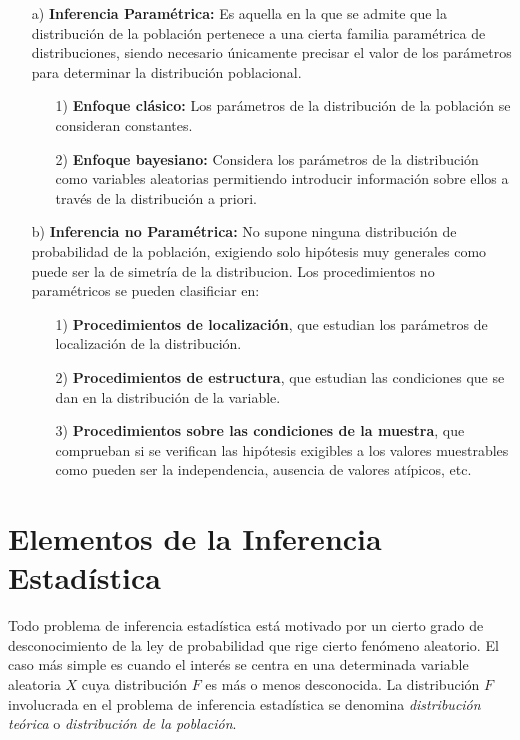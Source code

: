 \begin{enumerate}
    \item[a)] \textbf{Inferencia Paramétrica:} Es aquella en la que se admite que la distribución de la población pertenece a una cierta familia paramétrica de distribuciones, siendo necesario únicamente precisar el valor de los parámetros para determinar la distribución poblacional.
          \begin{enumerate}
              \item[1)] \textbf{Enfoque clásico:} Los parámetros de la distribución de la población se consideran constantes.
              \item[2)] \textbf{Enfoque bayesiano:} Considera los parámetros de la distribución como variables aleatorias permitiendo introducir información sobre ellos a través de la distribución a priori.
          \end{enumerate}
    \item[b)] \textbf{Inferencia no Paramétrica:} No supone ninguna distribución de probabilidad de la población, exigiendo solo hipótesis muy generales como puede ser la de simetría de la distribucion. Los procedimientos no paramétricos se pueden clasificiar en:
          \begin{enumerate}
              \item[1)] \textbf{Procedimientos de localización}, que estudian los parámetros de localización de la distribución.
              \item[2)] \textbf{Procedimientos de estructura}, que estudian las condiciones que se dan en la distribución de la variable.
              \item[3)] \textbf{Procedimientos sobre las condiciones de la muestra}, que comprueban si se verifican las hipótesis exigibles a los valores muestrables como pueden ser la independencia, ausencia de valores atípicos, etc.
          \end{enumerate}
\end{enumerate}

\section{Elementos de la Inferencia Estadística}

Todo problema de inferencia estadística está motivado por un cierto grado de desconocimiento de la ley de probabilidad que rige cierto fenómeno aleatorio. El caso más simple es cuando el interés se centra en una determinada variable aleatoria $X$ cuya distribución $F$ es más o menos desconocida. La distribución $F$ involucrada en el problema de inferencia estadística se denomina \textit{distribución teórica} o \textit{distribución de la población}.

